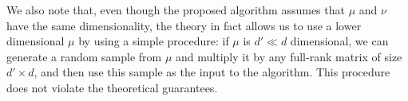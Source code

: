 We also note that, even though the proposed algorithm assumes that $\mu$ and $\nu$ have the same dimensionality, the theory in fact allows us to use a lower dimensional $\mu$ by using a simple procedure: if $\mu$ is $d' \ll d$ dimensional, we can generate a random sample from $\mu$ and multiply it by any full-rank matrix of size $d' \times d$, and then use this sample as the input to the algorithm. This procedure does not violate the theoretical guarantees. 
%
%
%


